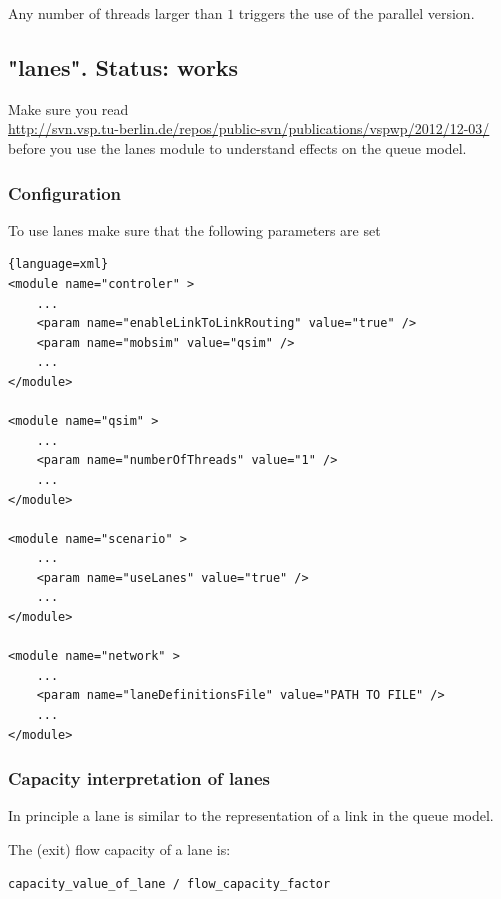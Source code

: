 Any number of threads larger than $1$ triggers the use of the parallel version.

\umbruch
\subsection{"lanes". Status: works}


Make sure you read
\\ \small{\url{http://svn.vsp.tu-berlin.de/repos/public-svn/publications/vspwp/2012/12-03/}}
\\
before you use the lanes module to understand effects on the queue model.

\subsubsection{Configuration}

To use lanes make sure that the following parameters are set

\begin{lstlisting}{language=xml}
<module name="controler" >	
	...
	<param name="enableLinkToLinkRouting" value="true" />
	<param name="mobsim" value="qsim" />
	...
</module>

<module name="qsim" >
	...
	<param name="numberOfThreads" value="1" />
	...
</module>

<module name="scenario" >
	...
	<param name="useLanes" value="true" />
	...
</module>

<module name="network" >
	...
	<param name="laneDefinitionsFile" value="PATH TO FILE" />
	...
</module>
\end{lstlisting}


\subsubsection{Capacity interpretation of lanes}

In principle a lane is similar to the representation of a link in the queue model. 

The (exit) flow capacity of a lane is:

\begin{lstlisting}
capacity_value_of_lane / flow_capacity_factor
\end{lstlisting}

